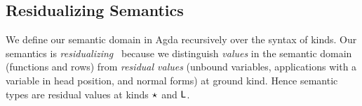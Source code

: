 \documentclass[sigplan,screen]{acmart}
\begin{document}
\subsection{Residualizing Semantics}
\label{sec:residual-semantics}

We define our semantic domain  in Agda recursively over the syntax of kinds. Our semantics is \emph{residualizing}~\citep{Lindley05} because we distinguish \emph{values} in the semantic domain (functions and rows) from \emph{residual values} (unbound variables, applications with a variable in head position, and normal forms) at ground kind. Hence semantic types are residual values at kinds $\star_{}$ and $\mathsf{L}$.

\begin{code}[hide]%
\>[0]\AgdaSpace{}%
\AgdaSpace{}%
\<%
\\
\>[0][@{}l@{\AgdaIndent{0}}]%
\>[2]\AgdaSpace{}%
\AgdaSpace{}%
\AgdaSpace{}%
\<%
\\
%
\>[2]\AgdaSpace{}%
\AgdaSpace{}%
\AgdaSpace{}%
\<%
\\
%
\>[2]\AgdaSpace{}%
\AgdaSpace{}%
\AgdaSpace{}%
\<%
\\
%
\>[2]\AgdaSpace{}%
\AgdaSpace{}%
\AgdaSpace{}%
\<%
\\
%
\>[2]\AgdaSpace{}%
\AgdaSpace{}%
\AgdaSpace{}%
\<%
\\
\>[0]\<%
\\
%
\>[2]\<%
\\
\>[2][@{}l@{\AgdaIndent{0}}]%
\>[4]\<%
\\
\>[4][@{}l@{\AgdaIndent{0}}]%
\>[6]\AgdaSpace{}%
\AgdaSymbol{:}\AgdaSpace{}%
\<%
\end{code}
\end{document}
